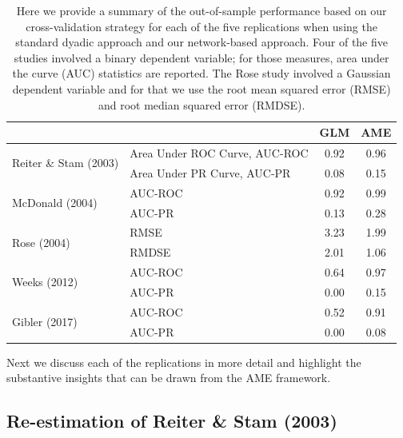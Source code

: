 \documentclass{article}[12pt]
\begin{document}
\begin{table}[ht]
\centering
	\begin{tabular}{l|l cc}
	~ & ~ & GLM & AME \\
	\toprule
\multirow{2}{*}{Reiter \& Stam (2003)} & Area Under ROC Curve, AUC-ROC & 0.92 & {0.96} \\
		~ & Area Under PR Curve, AUC-PR & 0.08 &  {0.15} \\		\midrule
\multirow{2}{*}{McDonald (2004)} & AUC-ROC & 0.92 &  {0.99} \\
		~ & AUC-PR & 0.13 &  {0.28} \\		\midrule
\multirow{2}{*}{Rose (2004)} & RMSE & 3.23 &  {1.99} \\
		~ & RMDSE & 2.01 &  {1.06} \\	\midrule
\multirow{2}{*}{Weeks (2012)} & AUC-ROC & 0.64 &  {0.97} \\
		~ & AUC-PR & 0.00 &  {0.15} \\		\midrule
\multirow{2}{*}{Gibler (2017)} & AUC-ROC & 0.52 &  {0.91} \\
		~ & AUC-PR & 0.00 &  {0.08} \\			\bottomrule
	\end{tabular}
	\caption{Here we provide a summary of the out-of-sample performance based on our cross-validation strategy for each of the five replications when using the standard dyadic approach and our network-based approach. Four of the five studies involved a binary dependent variable; for those measures, area under the curve (AUC) statistics are reported. The Rose study involved a Gaussian dependent variable and for that we use the root mean squared error (RMSE) and root median squared error (RMDSE). 
	}
	\label{tab:modelPerfSumm}
\end{table}
\FloatBarrier

Next we discuss each of the replications in more detail and highlight the substantive insights that can be drawn from the AME framework.

\subsection{Re-estimation of Reiter \& Stam (2003)}
\end{document}
